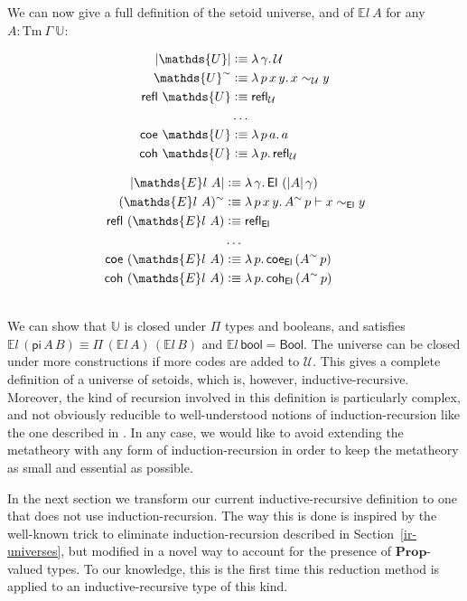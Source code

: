 \documentclass[autoref]{llncs}
\newcommand{\GG}{\Gamma}
\newcommand{\setoidU}{\mathcal{U}}
\newcommand{\mProp}{\mathbf{Prop}}
\newcommand{\Tm}{\mathrm{Tm}}
\newcommand{\El}{\textsf{El}}
\newcommand{\Uty}{\mathds{U}}
\newcommand{\EL}{\mathds{E}l}
\newcommand{\reflu}{\textsf{refl}_\setoidU}
\newcommand{\reflel}{\textsf{refl}_\El}
\newcommand{\eqel}[3]{#1 \vdash #2 \sim_\El #3}
\newcommand{\defeq}{\mathrel{\vcentcolon\equiv}}
\begin{document}
We can now give a full definition of the setoid universe, and of $\EL\ A$ for
any $A : \Tm\ \GG\ \Uty$: \\
{\small
\begin{minipage}{0.5\textwidth}
\begin{align*}
  | \Uty | &\defeq \lambda\, \gamma . \, \setoidU \\
  \Uty^\sim &\defeq \lambda \,p\, x\, y . \,x \sim_{\setoidU} y \\
  \textsf{refl}\ \Uty &\defeq \reflu \\
  &\ldots \\
  \textsf{coe}\ \Uty &\defeq \lambda\,p\,a . \, a \\
  \textsf{coh}\ \Uty &\defeq \lambda\,p . \, \reflu
\end{align*}
\end{minipage}
\begin{minipage}{0.5\textwidth}
\begin{align*}
  | \EL\ A | &\defeq \lambda \, \gamma . \, \El\ (| A | \,\gamma) \\
  (\EL\ A)^\sim &\defeq \lambda \, p \, x \, y . \, \eqel{A^\sim\,p}{x}{y} \\
  \textsf{refl}\ (\EL\ A) &\defeq \reflel \\
  &\ldots \\
  \textsf{coe}\ (\EL\ A) &\defeq \lambda\,p.\, \textsf{coe}_{\El}\,(A^\sim\,p) \\
  \textsf{coh}\ (\EL\ A) &\defeq \lambda\,p.\, \textsf{coh}_{\El}\,(A^\sim\,p)
\end{align*}
\end{minipage}}
\\

We can show that $\Uty$ is closed under $\Pi$ types and booleans, and satisfies
$\EL\,(\mathsf{pi}\,A\,B) \equiv \Pi\,(\EL\,A)\,(\EL\,B)$ and
$\EL\,\mathsf{bool} = \mathsf{Bool}$. The universe can be closed under more
constructions if more codes are added to $\setoidU$.
%
This gives a complete definition of a universe of setoids, which is, however,
inductive-recursive. Moreover, the kind of recursion involved in this definition
is particularly complex, and not obviously reducible to well-understood notions
of induction-recursion like the one described in \cite{dybjer-setzer}. In any
case, we would like to avoid extending the metatheory with any form of
induction-recursion in order to keep the metatheory as small and
essential as possible.

In the next section we transform our current inductive-recursive definition to
one that does not use induction-recursion.
%
The way this is done is inspired by the well-known trick to eliminate
induction-recursion described in Section~\ref{ir-universes}, but modified in a
novel way to account for the presence of $\mProp$-valued types. To our
knowledge, this is the first time this reduction method is applied to an
inductive-recursive type of this kind.
\end{document}
